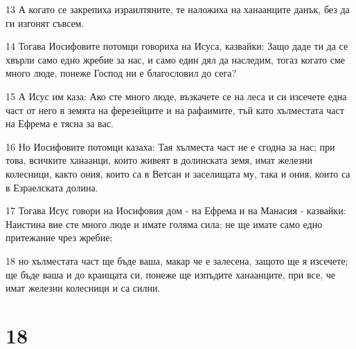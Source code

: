 \par 13 А когато се закрепиха израилтяните, те наложиха на ханаанците данък, без да ги изгонят съвсем.
\par 14 Тогава Иосифовите потомци говориха на Исуса, казвайки: Защо даде ти да се хвърли само едно жребие за нас, и само един дял да наследим, тогаз когато сме много люде, понеже Господ ни е благословил до сега?
\par 15 А Исус им каза: Ако сте много люде, възкачете се на леса и си изсечете една част от него в земята на ферезейците и на рафаимите, тъй като хълместата част на Ефрема е тясна за вас.
\par 16 Но Иосифовите потомци казаха: Тая хълместа част не е сгодна за нас; при това, всичките ханаанци, които живеят в долинската земя, имат железни колесници, както ония, които са в Ветсан и заселищата му, така и ония, които са в Езраелската долина.
\par 17 Тогава Исус говори на Иосифовия дом - на Ефрема и на Манасия - казвайки: Наистина вие сте много люде и имате голяма сила; не ще имате само едно притежание чрез жребие;
\par 18 но хълместата част ще бъде ваша, макар че е залесена, защото ще я изсечете; ще бъде ваша и до краищата си, понеже ще изпъдите ханаанците, при все, че имат железни колесници и са силни.

\chapter{18}

